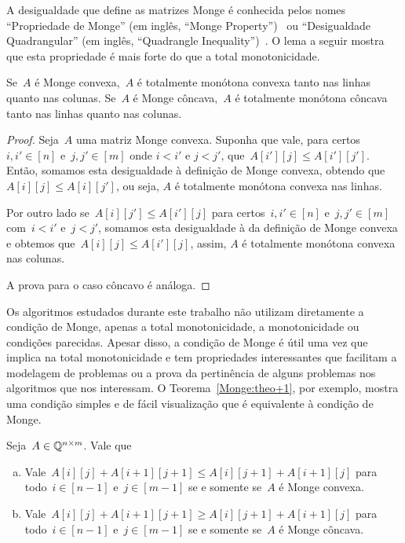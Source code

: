 A desigualdade que define as matrizes Monge é conhecida pelos nomes ``Propriedade de Monge'' (em inglês, ``Monge Property'')~\cite{Burkard:1996} ou ``Desigualdade Quadrangular'' (em inglês, ``Quadrangle Inequality'')~\cite{Yao:1980,Bein:2009}. O lema a seguir mostra que esta propriedade é mais forte do que a total monotonicidade. 

\begin{lema} \label{Monge:MCtoTM}
Se~$A$ é Monge convexa,~$A$ é totalmente monótona convexa tanto nas linhas quanto nas colunas. Se~$A$ é Monge côncava,~$A$ é totalmente monótona côncava tanto nas linhas quanto nas colunas.
\end{lema}

\begin{proof}
Seja~$A$ uma matriz Monge convexa. Suponha que vale, para certos~$i,i' \in [n]$ e~${ j,j' \in [m] }$ onde $i < i'$ e $j < j'$, que~$A[i'][j] \leq A[i'][j']$. Então, somamos esta desigualdade à definição de Monge convexa, obtendo que~$A[i][j] \leq A[i][j']$, ou seja, $A$ é totalmente monótona convexa nas linhas.  

Por outro lado se~${ A[i][j'] \leq A[i'][j] }$ para certos~${ i,i' \in [n] }$ e~${ j,j' \in [m] }$ com~${i < i'}$ e~${j < j'}$, somamos esta desigualdade à da definição de Monge convexa e obtemos que~${ A[i][j] \leq A[i'][j] }$, assim, $A$ é totalmente monótona convexa nas colunas.  

A prova para o caso côncavo é análoga.
\end{proof}

Os algoritmos estudados durante este trabalho não utilizam diretamente a condição de Monge, apenas a total monotonicidade, a monotonicidade ou condições parecidas. Apesar disso, a condição de Monge é útil uma vez que implica na total monotonicidade e tem propriedades interessantes que facilitam a modelagem de problemas ou a prova da pertinência de alguns problemas nos algoritmos que nos interessam. O Teorema~\ref{Monge:theo+1}, por exemplo, mostra uma condição simples e de fácil visualização que é equivalente à condição de Monge.

\begin{theo} \label{Monge:theo+1}
Seja~$A \in \mathbb{Q}^{n \times m}$. Vale que

\begin{enumerate}[(a)]
\item Vale~${A[i][j] + A[i+1][j+1] \leq A[i][j+1] + A[i+1][j]}$ para todo~${i \in [n-1]}$ e~${j \in [m-1]}$ se e somente se~$A$ é Monge convexa. \label{Monge:theo+1:convex}

\item Vale~${A[i][j] + A[i+1][j+1] \geq A[i][j+1] + A[i+1][j]}$ para todo~${i \in [n-1]}$ e~${j \in [m-1]}$ se e somente se~$A$ é Monge côncava. \label{Monge:theo+1:concave}
\end{enumerate}
\end{theo}

